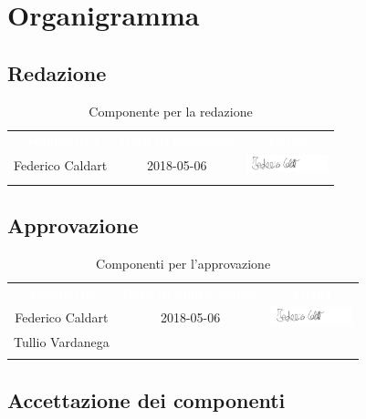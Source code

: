 \newpage
\renewcommand{\arraystretch}{1}

\section{Organigramma}

\subsection{Redazione}
\begin{longtable}{ c  c  c }
	\rowcolor{bluSOS}
	\textcolor{white}{\textbf{Nominativo}} & \textcolor{white}{\textbf{Data di redazione}} & \textcolor{white}{\textbf{Firma}}\\
	
	Federico Caldart & 2018-05-06 & \includegraphics[height=0.5cm]{img/Firme/FedericoCaldart.png}\\
	\caption{Componente per la redazione}  \\
\end{longtable}

\subsection{Approvazione}
\begin{longtable}{ c  c  c }
	\rowcolor{bluSOS}
	\textcolor{white}{\textbf{Nominativo}} & \textcolor{white}{\textbf{Data di approvazione}} & \textcolor{white}{\textbf{Firma}}\\
	
	Federico Caldart & 2018-05-06 & \includegraphics[height=0.5cm]{img/Firme/FedericoCaldart.png}  \\
	Tullio Vardanega & & \\
	\rowcolor{white}\caption{Componenti per l'approvazione}\\
\end{longtable}

\subsection{Accettazione dei componenti}

